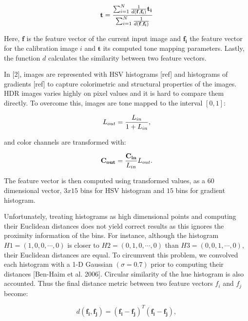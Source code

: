 \begin{equation}
\label{eq:inv_distance_transform}
    \mathbf{t} = {{\sum _{i=1} ^{N} {1 \over {d(\mathbf{f}, \mathbf{f_i})}} \mathbf{t_i}} \over {\sum _{i=1} ^{N} {1 \over {d(\mathbf{f}, \mathbf{f_i})}}}}
\end{equation}

Here, $\mathbf{f}$ is the feature vector of the current input image and $\mathbf{f_i}$ the feature vector for the calibration image $i$ and $\mathbf{t}$ its computed tone mapping parameters. Lastly, the function $d$ calculates the similarity between two feature vectors.

In [2], images are represented with HSV histograms [ref] and histograms of gradients [ref] to capture colorimetric and structural properties of the images. HDR images varies highly on pixel values and it is hard to compare them directly. To overcome this, images are tone mapped to the interval $[0,1]$:

\begin{equation}
    L_{out} = {{L_{in}} \over {1 + L_{in}}}, 
\end{equation}

and color channels are transformed with:

\begin{equation}
    \mathbf{C_{out}} = {{\mathbf{C_{in}}}\over{L_{in}}} L_{out}.
\end{equation}

The feature vector is then computed using transformed values, as a $60$ dimensional vector, $3x15$ bins for HSV histogram and $15$ bins for gradient histogram. 

Unfortunately, treating histograms as high dimensional points and computing their Euclidean distances does not yield correct results as this ignores the proximity information of the bins. For instance, although the histogram $H1 = (1, 0, 0, \cdots, 0)$ is closer to
$H2 = (0, 1, 0, \cdots, 0)$ than $H3 = (0, 0, 1, \cdots, 0)$, their Euclidean distances are equal. To circumvent this problem, we convolved each histogram with a 1-D Gaussian $(\sigma = 0.7)$ prior to computing their distances [Ben-Haim et al. 2006]. Circular similarity of the hue histogram is also accounted. Thus the final distance metric between two feature vectors \textbf{$f_i$} and \textbf{$f_j$} become:

\begin{equation}
    d(\mathbf{f_i, f_j}) = \mathbf{(f_i - f_j)}^T\mathbf{(f_i-f_j)},
\end{equation}

